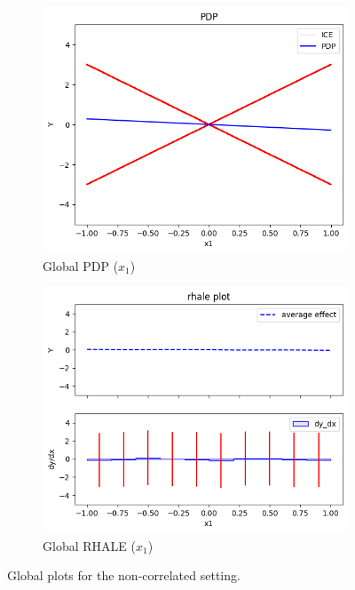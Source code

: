 \documentclass[
twocolumn,
]{ceurart}
\begin{document}
\begin{figure}[t]
    \centering
    \begin{subfigure}[b]{0.24\textwidth}
        \centering
        \includegraphics[width=\textwidth]{figures/simulation_1/uncor_global_pdp.png}
        \caption{Global PDP ($x_1$)}
        \label{subfig:global_pdp}
    \end{subfigure}
    \begin{subfigure}[b]{0.24\textwidth}
        \centering
        \includegraphics[width=\textwidth]{figures/simulation_1/uncor_global_rhale.png}
        \caption{Global RHALE ($x_1$)}
        \label{subfig:global_rhale}
    \end{subfigure}
    \caption{Global plots for the non-correlated setting.}
    \label{fig:synthetic-1-uncorrelated}
  \end{figure}
\end{document}
